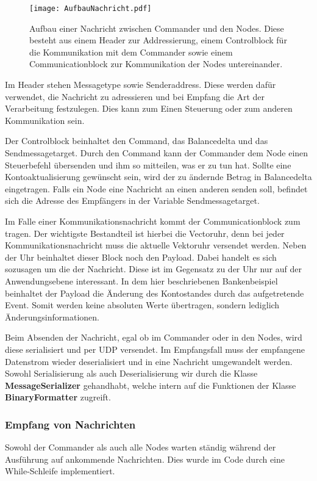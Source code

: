 \begin{figure}[ht]
	\centering
	\texttt{[image: AufbauNachricht.pdf]}
	\caption[Aufbau einer Nachricht]{Aufbau einer Nachricht zwischen Commander und den Nodes. Diese besteht aus einem Header zur Addressierung, einem Controlblock für die Kommunikation mit dem Commander sowie einem Communicationblock zur Kommunikation der Nodes untereinander.}
	\label{figure:aufbauNachricht}
\end{figure}

Im Header stehen Messagetype sowie Senderaddress. Diese werden dafür verwendet, die Nachricht zu adressieren und bei Empfang die Art der Verarbeitung festzulegen. Dies kann zum Einen Steuerung oder zum anderen Kommunikation sein.

Der Controlblock beinhaltet den Command, das Balancedelta und das Sendmessagetarget. Durch den Command kann der Commander dem Node einen Steuerbefehl übersenden und ihm so mitteilen, was er zu tun hat. Sollte eine Kontoaktualisierung gewünscht sein, wird der zu ändernde Betrag in Balancedelta eingetragen. Falls ein Node eine Nachricht an einen anderen senden soll, befindet sich die Adresse des Empfängers in der Variable Sendmessagetarget.

Im Falle einer Kommunikationsnachricht kommt der Communicationblock zum tragen. Der wichtigste Bestandteil ist hierbei die Vectoruhr, denn bei jeder Kommunikationsnachricht muss die aktuelle Vektoruhr versendet werden. Neben der Uhr beinhaltet dieser Block noch den Payload. Dabei handelt es sich sozusagen um die  der Nachricht. Diese ist im Gegensatz zu der Uhr nur auf der Anwendungsebene interessant. In dem hier beschriebenen Bankenbeispiel beinhaltet der Payload die Änderung des Kontostandes durch das aufgetretende Event. Somit werden keine absoluten Werte übertragen, sondern lediglich Änderungsinformationen.

Beim Absenden der Nachricht, egal ob im Commander oder in den Nodes, wird diese serialisiert und per UDP versendet. Im Empfangsfall muss der empfangene Datenstrom wieder deserialisiert und in eine Nachricht umgewandelt werden. Sowohl Serialisierung als auch Deserialisierung wir durch die Klasse \textbf{MessageSerializer} gehandhabt, welche intern auf die Funktionen der Klasse \textbf{BinaryFormatter} zugreift.

\FloatBarrier
\subsubsection{Empfang von Nachrichten}
\label{empfangVonNachrichten}
Sowohl der Commander als auch alle Nodes warten ständig während der Ausführung auf ankommende Nachrichten. Dies wurde im Code durch eine While-Schleife implementiert.

